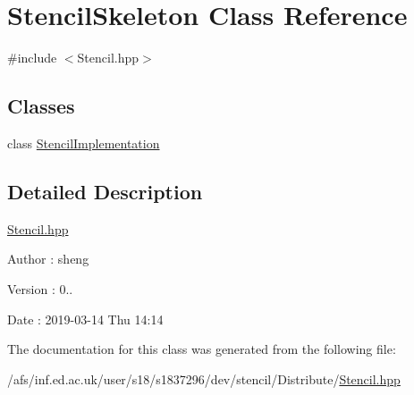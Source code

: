 \hypertarget{classStencilSkeleton}{\section{Stencil\-Skeleton Class Reference}
\label{classStencilSkeleton}
}


{\ttfamily \#include $<$Stencil.\-hpp$>$}

\subsection*{Classes}
\begin{DoxyCompactItemize}
\item 
class \hyperlink{classStencilSkeleton_1_1StencilImplementation}{Stencil\-Implementation}
\end{DoxyCompactItemize}


\subsection{Detailed Description}
\hyperlink{Stencil_8hpp}{Stencil.\-hpp}

\begin{DoxyAuthor}{Author}
\-: sheng 
\end{DoxyAuthor}
\begin{DoxyVersion}{Version}
\-: 0.. 
\end{DoxyVersion}
\begin{DoxyDate}{Date}
\-: 2019-\/03-\/14 Thu 14\-:14 
\end{DoxyDate}


The documentation for this class was generated from the following file\-:\begin{DoxyCompactItemize}
\item 
/afs/inf.\-ed.\-ac.\-uk/user/s18/s1837296/dev/stencil/\-Distribute/\hyperlink{Stencil_8hpp}{Stencil.\-hpp}\end{DoxyCompactItemize}
